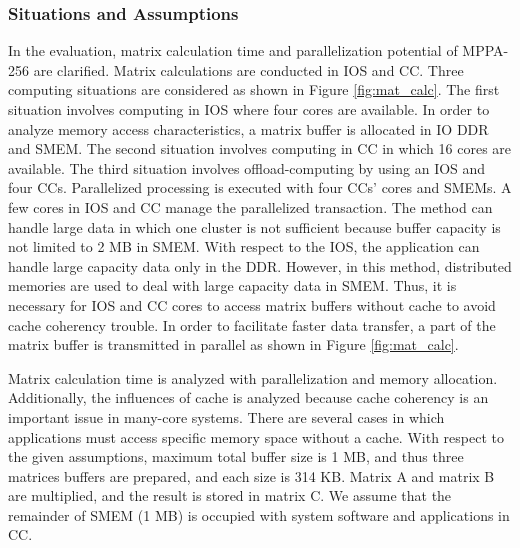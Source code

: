 \documentclass[conference,compsoc]{IEEEtran}
\begin{document}
\subsubsection{Situations and Assumptions}
\label{sec:situations_and_assumptions}
In the evaluation, matrix calculation time and parallelization potential of MPPA-256 are clarified.
Matrix calculations are conducted in IOS and CC.
Three computing situations are considered as shown in Figure \ref{fig:mat_calc}.
The first situation involves computing in IOS where four cores are available.
In order to analyze memory access characteristics, a matrix buffer is allocated in IO DDR and SMEM.
The second situation involves computing in CC in which 16 cores are available.
The third situation involves offload-computing by using an IOS and four CCs.
Parallelized processing is executed with four CCs' cores and SMEMs.
A few cores in IOS and CC manage the parallelized transaction.
The method can handle large data in which one cluster is not sufficient because buffer capacity is not limited to 2 MB in SMEM.
With respect to the IOS, the application can handle large capacity data only in the DDR.
However, in this method, distributed memories are used to deal with large capacity data in SMEM.
Thus, it is necessary for IOS and CC cores to access matrix buffers without cache to avoid cache coherency trouble.
In order to facilitate faster data transfer, a part of the matrix buffer is transmitted in parallel as shown in Figure \ref{fig:mat_calc}.

Matrix calculation time is analyzed with parallelization and memory allocation.
Additionally, the influences of cache is analyzed because cache coherency is an important issue in many-core systems.
There are several cases in which applications must access specific memory space without a cache.
With respect to the given assumptions, maximum total buffer size is 1 MB, and thus three matrices buffers are prepared, and each size is 314 KB.
Matrix A and matrix B are multiplied, and the result is stored in matrix C.
We assume that the remainder of SMEM (1 MB) is occupied with system software and applications in CC.
\end{document}
